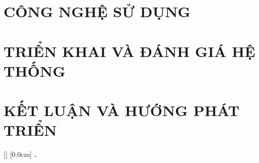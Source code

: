\documentclass[a4paper,13pt,3p,twoside]{report}
\renewcommand{\bibname}{Danh_sach_tai_lieu_tham_khao}
\theoremstyle{definition}
\begin{document}
\chapter{CÔNG NGHỆ SỬ DỤNG}
\label{chapter:Technology}


\newpage
\chapter{TRIỂN KHAI VÀ ĐÁNH GIÁ HỆ THỐNG}
\label{chapter:Implementation}


\newpage
\chapter{KẾT LUẬN VÀ HƯỚNG PHÁT TRIỂN}
\label{chapter:Conclusion}


\newpage
\renewcommand\bibname{TÀI LIỆU THAM KHẢO}
\nocite{*}
\printbibliography
{}

[]
\titlespacing*{\chapter}{0pt}{-20pt}{20pt}
  [0.0cm]
  {\bfseries\vspace{0.3cm}}
  {{\bfseries{\scshape} \thecontentslabel.\ }}
  {}
  {\contentspage}
\end{document}
